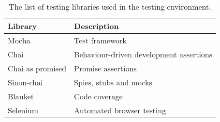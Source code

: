 \begin{table}[H]
\caption[Testing environment]{The list of testing libraries used in the testing environment.}
\label{tab:testing_environment}
\begin{tabularx}{\textwidth}{@{}XX@{}}
	\toprule
	\textbf{Library} & \textbf{Description} \\
	\midrule
	Mocha & Test framework \\
	Chai & Behaviour-driven development assertions \\
	Chai as promised & Promise assertions \\
	Sinon-chai & Spies, stubs and mocks \\
	Blanket & Code coverage \\
	Selenium & Automated browser testing \\
	\bottomrule
\end{tabularx}
\end{table}